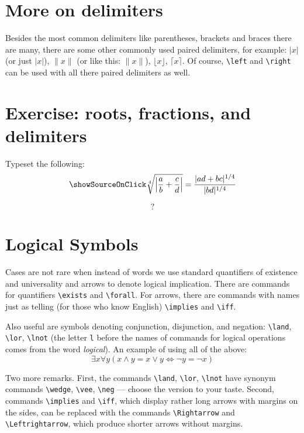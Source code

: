 \section{More on delimiters}
\par Besides the most common delimiters like parentheses, brackets and braces there are many, there are some other commonly used paired delimiters, for example: \( \lvert x \rvert \) (or just \( |x| \)), \( \lVert x \rVert \) (or like this: \( \| x \| \)), \( \lfloor x \rfloor \), \( \lceil x \rceil\). Of course, \verb"\left" and \verb"\right" can be used with all there paired delimiters as well.

\section{Exercise: roots, fractions, and delimiters}
\begin{staticpart}
Typeset the following: \[\showSourceOnClick \sqrt[4]{\left\lvert\frac{a}{b}+\frac{c}{d}\right\rvert}=\frac{|ad+bc|^{1/4}}{|bd|^{1/4}}\]
\end{staticpart}
\[?\]

\section{Logical Symbols}
\par Cases are not rare when instead of words we use standard quantifiers of existence and universality and arrows to denote logical implication. There are commands for quantifiers \verb"\exists" and \verb"\forall". For arrows, there are commands with names just as telling (for those who know English) \verb"\implies" and \verb"\iff".
\par Also useful are symbols denoting conjunction, disjunction, and negation: \verb"\land", \verb"\lor", \verb"\lnot" (the letter \verb"l" before the names of commands for logical operations comes from the word \emph{logical}). An example of using all of the above: \[ \exists x \forall y (x\land y=x\lor y \iff \lnot y=\lnot x) \]
\par Two more remarks. First, the commands \verb"\land", \verb"\lor", \verb"\lnot" have synonym commands \verb"\wedge", \verb"\vee", \verb"\neg" --- choose the version to your taste. Second, commands \verb"\implies" and \verb"\iff", which display rather long arrows with margins on the sides, can be replaced with the commands \verb"\Rightarrow" and \verb"\Leftrightarrow", which produce shorter arrows without margins.\index{\Rightarrow,\Leftrightarrow}


